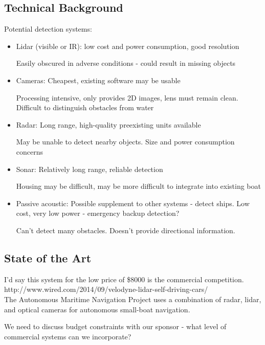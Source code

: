 \subsection{\label{sec:intro:technical-background}Technical Background}
Potential detection systems:
\begin{itemize}

\item Lidar (visible or IR): 
low cost and power consumption, good resolution

Easily obscured in adverse conditions - could result in missing objects

\item Cameras: 
Cheapest, existing software may be usable

Processing intensive, only provides 2D images, lens must remain clean.  Difficult to distinguish obstacles from water

\item Radar:
Long range, high-quality preexisting units available

May be unable to detect nearby objects.  Size and power consumption concerns

\item Sonar:
Relatively long range, reliable detection

Housing may be difficult, may be more difficult to integrate into existing boat

\item Passive acoustic:
Possible supplement to other systems - detect ships.  Low cost, very low power - emergency backup detection?

Can't detect many obstacles.  Doesn't provide directional information.
\end{itemize}

\subsection{\label{sec:intro:commercial}State of the Art}
I'd say this system for the low price of \$8000 is the commercial competition.\\
http://www.wired.com/2014/09/velodyne-lidar-self-driving-cars/\\

The Autonomous Maritime Navigation Project uses a combination of radar, lidar, and optical cameras for autonomous small-boat navigation.

We need to discuss budget constraints with our sponsor - what level of commercial systems can we incorporate?

